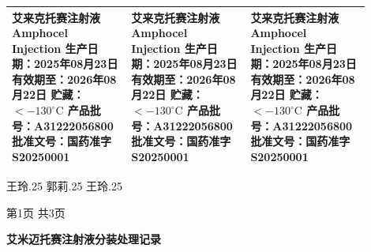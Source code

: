 \documentclass[UTF8,10pt,a4paper,fontset=fandol]{ctexart}
\newcommand{\handwritten}[1]{#1}
\begin{document}
\begin{tabular}{|p{0.30\linewidth}|p{0.30\linewidth}|p{0.30\linewidth}|}
\hline
\centering
\textbf{艾来克托赛注射液}\newline
Amphocel Injection\newline
生产日期：2025年08月23日\newline
有效期至：2026年08月22日\newline
贮藏：$<-130^\circ\mathrm{C}$\newline
产品批号：A31222056800\newline
批准文号：国药准字S20250001
&
\centering
\textbf{艾来克托赛注射液}\newline
Amphocel Injection\newline
生产日期：2025年08月23日\newline
有效期至：2026年08月22日\newline
贮藏：$<-130^\circ\mathrm{C}$\newline
产品批号：A31222056800\newline
批准文号：国药准字S20250001
&
\centering
\textbf{艾来克托赛注射液}\newline
Amphocel Injection\newline
生产日期：2025年08月23日\newline
有效期至：2026年08月22日\newline
贮藏：$<-130^\circ\mathrm{C}$\newline
产品批号：A31222056800\newline
批准文号：国药准字S20250001
\\
\hline
\end{tabular}

\medskip

\handwritten{王玲.25}
\hfill
\handwritten{郭莉.25}
\hfill
\handwritten{王玲.25}

\vfill

\begin{center}
第1页 共3页
\end{center}

\newpage

\begin{center}
\textbf{艾米迈托赛注射液分装处理记录}
\end{center}
\end{document}
